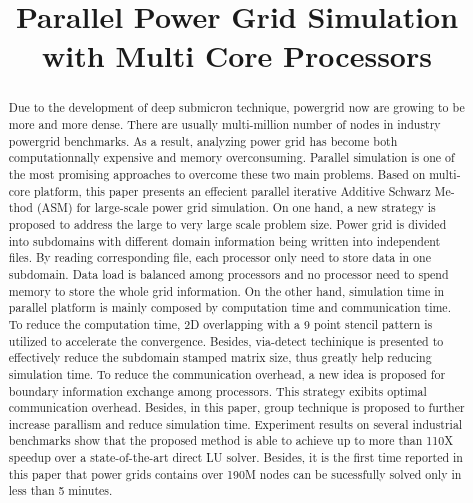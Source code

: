 \documentclass{sig-alternate}
\begin{document}
\title{Parallel Power Grid Simulation with Multi Core Processors}

\maketitle

\begin{abstract}
	Due to the development of deep submicron technique, powergrid now are growing to be more and more dense. There are usually 
	multi-million number of nodes in industry powergrid benchmarks. As a result, analyzing power grid has become both 
	computationnally expensive and memory 
	overconsuming. Parallel simulation is one of the most promising approaches to overcome these two main problems. Based on 
	multi-core platform, this paper presents an effecient parallel iterative Additive Schwarz Me-thod (ASM) for large-scale 
	power grid simulation. On one hand, a new strategy is proposed to address the large to very large scale problem size. Power 
	grid is divided into subdomains with different domain information being written into independent files. By reading corresponding 
	file, each processor only need to store data in one subdomain. Data load is balanced among processors and no processor
	need to spend memory to store the whole grid information. On the other hand, simulation time in parallel platform is mainly composed by 
	computation time and communication time. To reduce the computation time, 2D overlapping with a 9 point stencil pattern is 
	utilized to accelerate the convergence. Besides, via-detect techinique is presented to effectively reduce the subdomain 
	stamped matrix size, thus greatly help reducing simulation time. To reduce the communication overhead, a new idea is 
	proposed for boundary information exchange among processors. This strategy exibits optimal 
	communication overhead. Besides, in this paper, group technique is proposed to further increase parallism and reduce 
	simulation time. Experiment results on several industrial benchmarks show that the proposed method is able to achieve up to 
	more than 110X speedup over a state-of-the-art direct LU solver. Besides, it is the first time reported in this paper that 
	power grids contains over 190M nodes can be sucessfully solved only in less than 5 minutes.
\end{abstract}
\end{document}
